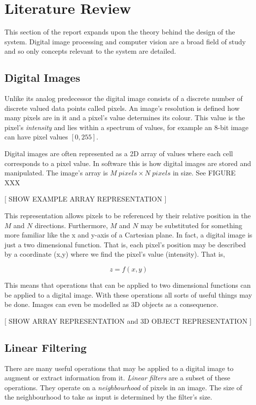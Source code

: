 \chapter{Literature Review}
This section of the report expands upon the theory behind the design of the system. Digital image processing and computer vision are a broad field of study and so only concepts relevant to the system are detailed.

\section{Digital Images}
Unlike its analog predecessor the digital image consists of a discrete number of discrete valued data points called pixels. An image's resolution is defined how many pixels are in it and a pixel's value determines its colour. This value is the pixel's \emph{intensity} and lies within a spectrum of values, for example an 8-bit image can have pixel values $[0, 255]$. 

Digital images are often represented as a 2D array of values where each cell corresponds to a pixel value. In software this is how digital images are stored and manipulated. The image's array is $M\;pixels\times N\; pixels$ in size. See FIGURE XXX

[ SHOW EXAMPLE ARRAY REPRESENTATION ]

This representation allows pixels to be referenced by their relative position in the $M$ and $N$ directions. Furthermore, $M$ and $N$ may be substituted for something more familiar like the x and y-axis of a Cartesian plane. In fact, a digital image is just a two dimensional function. That is, each pixel's position may be described by a coordinate (x,y) where we find the pixel's value (intensity). That is, 

\[z = f(x,y)\]

This means that operations that can be applied to two dimensional functions can be applied to a digital image. With these operations all sorts of useful things may be done. Images can even be modelled as 3D objects as a consequence.

[ SHOW ARRAY REPRESENTATION and 3D OBJECT REPRESENTATION  ]




\section{Linear Filtering}

There are many useful operations that may be applied to a digital image to augment or extract information from it. \emph{Linear filters} are a subset of these operations. They operate on a \emph{neighbourhood} of pixels in an image. The size of the neighbourhood to take as input is determined by the filter's size. 

